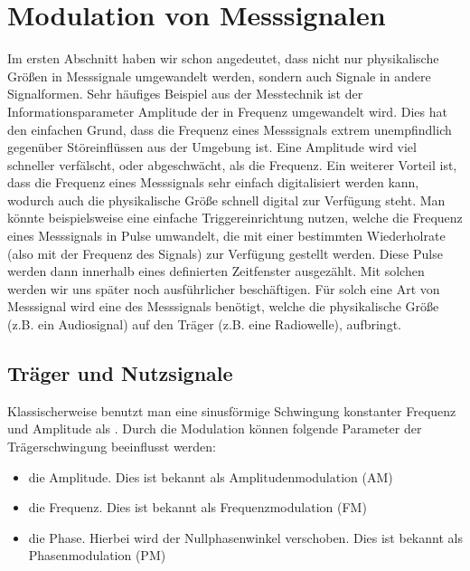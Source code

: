 \documentclass[letterpaper,10pt,english]{jupyterBook}
\begin{document}
\section{Modulation von Messsignalen }
\label{\detokenize{content/3_Modulationen:modulation-von-messsignalen-a-id-subsec-information-a}}\label{\detokenize{content/3_Modulationen::doc}}
\sphinxAtStartPar
Im ersten Abschnitt haben wir schon angedeutet, dass nicht nur physikalische Größen in Messsignale umgewandelt werden, sondern auch Signale in andere Signalformen. Sehr häufiges Beispiel aus der Messtechnik ist der Informationsparameter Amplitude der in Frequenz umgewandelt wird. Dies hat den einfachen Grund, dass die Frequenz eines Messsignals extrem unempfindlich gegenüber Störeinflüssen aus der Umgebung ist. Eine Amplitude wird viel schneller verfälscht, oder abgeschwächt, als die Frequenz. Ein weiterer Vorteil ist, dass die Frequenz eines Messsignals sehr einfach digitalisiert werden kann, wodurch auch die physikalische Größe schnell digital zur Verfügung steht. Man könnte beispielsweise eine einfache Triggereinrichtung nutzen, welche die Frequenz eines Messsignals in Pulse umwandelt, die mit einer bestimmten Wiederholrate (also mit der Frequenz des Signals) zur Verfügung gestellt werden. Diese Pulse werden dann innerhalb eines definierten Zeitfenster ausgezählt. Mit solchen  werden wir uns später noch ausführlicher beschäftigen. Für solch eine Art von Messsignal wird eine  des Messsignals benötigt, welche die physikalische Größe (z.B. ein Audiosignal) auf den Träger (z.B. eine Radiowelle), aufbringt.


\subsection{Träger\sphinxhyphen{} und Nutzsignale}
\label{\detokenize{content/3_Modulationen:trager-und-nutzsignale}}
\sphinxAtStartPar
Klassischerweise benutzt man eine sinusförmige Schwingung konstanter Frequenz und Amplitude als . Durch die Modulation können folgende Parameter der Trägerschwingung beeinflusst werden:
\begin{itemize}
\item {} 
\sphinxAtStartPar
die Amplitude. Dies ist bekannt als Amplitudenmodulation (AM)

\item {} 
\sphinxAtStartPar
die Frequenz. Dies ist bekannt als Frequenzmodulation (FM)

\item {} 
\sphinxAtStartPar
die Phase. Hierbei wird der Nullphasenwinkel verschoben. Dies ist bekannt als Phasenmodulation (PM)

\end{itemize}
\end{document}
